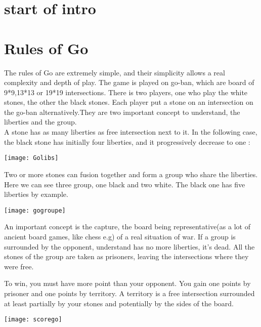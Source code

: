 \section{start of intro}

\section{Rules of Go}

The rules of Go are extremely simple, and their simplicity allows a real complexity and depth of play. The game is played on go-ban, which are board of 9*9,13*13 or 19*19 intersections. There is two players, one who play the white stones, the other the black stones. Each player put a stone on an intersection on the go-ban alternatively.They are two important concept to understand, the liberties and the group. 
\\

A stone has as many liberties as free intersection next to it. In the following case, the black stone has initially four liberties, and it progressively decrease to one : 

\begin{center}
\texttt{[image: Golibs]}
\end{center}

Two or more stones can fusion together and form a group who share the liberties. Here we can see three group, one black and two white. The black one has five liberties by example. 

\begin{center}
\texttt{[image: gogroupe]}
\end{center}

An important concept is the capture, the board being representative(as a lot of ancient board games, like chess e.g) of a real situation of war. If a group is surrounded by the opponent, understand has no more liberties, it's dead. All the stones of the group are taken as prisoners, leaving the intersections where they were free. 

To win, you must have more point than your opponent. You gain one points by prisoner and one points by territory. A territory is a free intersection surrounded at least partially by your stones and potentially by the sides of the board. 

\begin{center}
\texttt{[image: scorego]}
\end{center}
